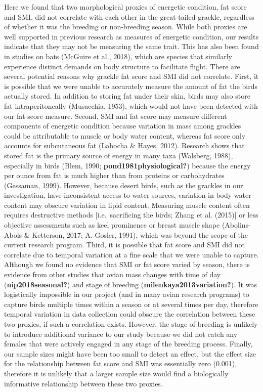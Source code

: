 \documentclass[
]{article}
\begin{document}
Here we found that two morphological proxies of energetic condition, fat
score and SMI, did not correlate with each other in the great-tailed
grackle, regardless of whether it was the breeding or non-breeding
season. While both proxies are well supported in previous research as
measures of energetic condition, our results indicate that they may not
be measuring the same trait. This has also been found in studies on bats
(McGuire et al., 2018), which are species that similarly experience
distinct demands on body structure to facilitate flight. There are
several potential reasons why grackle fat score and SMI did not
correlate. First, it is possible that we were unable to accurately
measure the amount of fat the birds actually stored. In addition to
storing fat under their skin, birds may also store fat intraperitoneally
(Musacchia, 1953), which would not have been detected with our fat score
measure. Second, SMI and fat score may measure different components of
energetic condition because variation in mass among grackles could be
attributable to muscle or body water content, whereas fat score only
accounts for subcutaneous fat (Labocha \& Hayes, 2012). Research shows
that stored fat is the primary source of energy in many taxa (Walsberg,
1988), especially in birds (Blem, 1990; \textbf{pond1981physiological?})
because the energy per ounce from fat is much higher than from proteins
or carbohydrates (Gessaman, 1999). However, because desert birds, such
as the grackles in our investigation, have inconsistent access to water
sources, variation in body water content may obscure variation in lipid
content. Measuring muscle content often requires destructive methods
{[}i.e.~sacrificing the birds; Zhang et al. (2015){]} or less objective
assessments such as keel prominence or breast muscle shape
(Abolins-Abols \& Ketterson, 2017; A. Gosler, 1991), which was beyond
the scope of the current research program. Third, it is possible that
fat score and SMI did not correlate due to temporal variation at a fine
scale that we were unable to capture. Although we found no evidence that
SMI or fat score varied by season, there is evidence from other studies
that avian mass changes with time of day (\textbf{nip2018seasonal?}) and
stage of breeding (\textbf{milenkaya2013variation?}). It was
logistically impossible in our project (and in many avian research
programs) to capture birds multiple times within a season or at several
times per day, therefore temporal variation in data collection could
obscure the correlation between these two proxies, if such a correlation
exists. However, the stage of breeding is unlikely to introduce
additional variance to our study because we did not catch any females
that were actively engaged in any stage of the breeding process.
Finally, our sample sizes might have been too small to detect an effect,
but the effect size for the relationship between fat score and SMI was
essentially zero (0.001), therefore it is unlikely that a larger sample
size would find a biologically informative relationship between these
two proxies.
\end{document}

